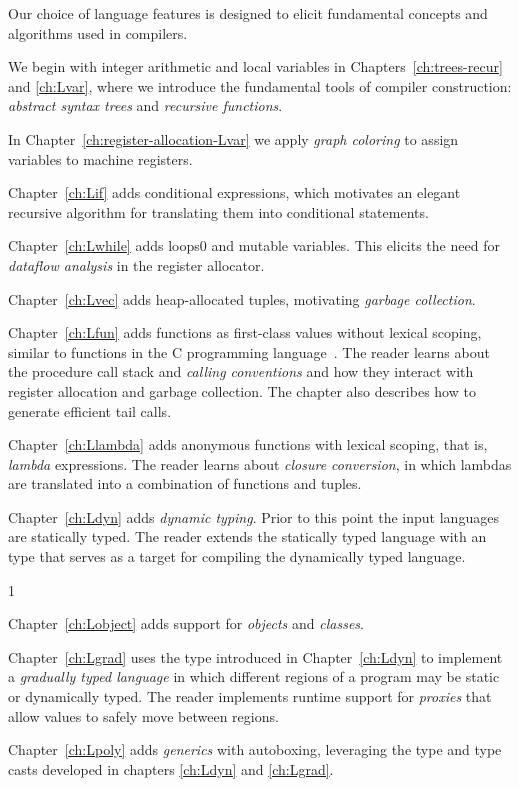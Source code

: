 \documentclass[7x10]{TimesAPriori_MIT}%
\def\racketEd{0}
\def\pythonEd{1}
\def\edition{0}
\newcommand{\racket}[1]{{\if\edition\racketEd{#1}\fi}}
\numberwithin{theorem}{chapter}
\numberwithin{definition}{chapter}
\numberwithin{equation}{chapter}
\begin{document}
Our choice of language features is designed to elicit fundamental
concepts and algorithms used in compilers.
\begin{itemize}
\item We begin with integer arithmetic and local variables in
  Chapters~\ref{ch:trees-recur} and \ref{ch:Lvar}, where we introduce
  the fundamental tools of compiler construction: \emph{abstract
    syntax trees} and \emph{recursive functions}. 
\item In Chapter~\ref{ch:register-allocation-Lvar} we apply
  \emph{graph coloring} to assign variables to machine registers.
\item Chapter~\ref{ch:Lif} adds conditional expressions, which
  motivates an elegant recursive algorithm for translating them into
  conditional  statements.
\item Chapter~\ref{ch:Lwhile} adds loops\racket{ and mutable
  variables}. This elicits the need for \emph{dataflow
    analysis} in the register allocator.
\item Chapter~\ref{ch:Lvec} adds heap-allocated tuples, motivating
  \emph{garbage collection}.
\item Chapter~\ref{ch:Lfun} adds functions as first-class values 
  without lexical scoping, similar to functions in the C programming
  language~\citep{Kernighan:1988nx}. The reader learns about the
  procedure call stack and \emph{calling conventions} and how they interact
  with register allocation and garbage collection. The chapter also
  describes how to generate efficient tail calls.
\item Chapter~\ref{ch:Llambda} adds anonymous functions with lexical
  scoping, that is, \emph{lambda} expressions. The reader learns about
  \emph{closure conversion}, in which lambdas are translated into a
  combination of functions and tuples.
\item Chapter~\ref{ch:Ldyn} adds \emph{dynamic typing}. Prior to this
  point the input languages are statically typed.  The reader extends
  the statically typed language with an  type that serves
  as a target for compiling the dynamically typed language.
{\if\edition\pythonEd
\item Chapter~\ref{ch:Lobject} adds support for \emph{objects} and
  \emph{classes}.
\fi}
\item Chapter~\ref{ch:Lgrad} uses the  type introduced in
  Chapter~\ref{ch:Ldyn} to implement a \emph{gradually typed language}
  in which different regions of a program may be static or dynamically
  typed. The reader implements runtime support for \emph{proxies} that
  allow values to safely move between regions.
\item Chapter~\ref{ch:Lpoly} adds \emph{generics} with autoboxing,
  leveraging the  type and type casts developed in chapters
  \ref{ch:Ldyn} and \ref{ch:Lgrad}.
\end{itemize}
\end{document}
